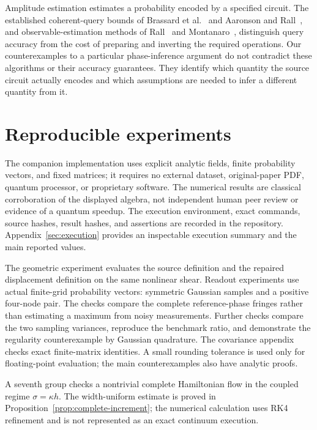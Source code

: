 \documentclass[11pt]{article}
\theoremstyle{definition}
\theoremstyle{remark}
\begin{document}
Amplitude estimation estimates a probability encoded by a specified circuit.
The established coherent-query bounds of Brassard et al.~\cite{bhmt} and
Aaronson and Rall~\cite{aaronsonrall}, and observable-estimation methods of
Rall~\cite{rall,rallcoherent} and Montanaro~\cite{montanaro}, distinguish query
accuracy from the cost of preparing and inverting the required operations.
Our counterexamples to a particular phase-inference argument do not contradict
these algorithms or their accuracy guarantees. They identify which quantity
the source circuit actually encodes and which assumptions are needed to infer
a different quantity from it.







\section{Reproducible experiments}
\label{sec:experiments}
The companion implementation uses explicit analytic fields, finite probability
vectors, and fixed matrices; it requires no external dataset, original-paper
PDF, quantum processor, or proprietary software. The numerical results are
classical corroboration of the displayed algebra, not independent human peer
review or evidence of a quantum speedup. The execution environment, exact
commands, source hashes, result hashes, and assertions are recorded in the
repository. Appendix~\ref{sec:execution} provides an inspectable execution
summary and the main reported values.

The geometric experiment evaluates the source definition and the repaired
displacement definition on the same nonlinear shear. Readout experiments use
actual finite-grid probability vectors: symmetric Gaussian samples and a
positive four-node pair. The checks compare the complete reference-phase
fringes rather than estimating a maximum from noisy measurements. Further
checks compare the two sampling variances, reproduce the benchmark ratio,
and demonstrate the regularity counterexample by Gaussian quadrature.
The covariance appendix checks exact finite-matrix identities. A small
rounding tolerance is used only for floating-point evaluation; the main
counterexamples also have analytic proofs.

A seventh group checks a nontrivial complete Hamiltonian flow in the coupled
regime $\sigma=\kappa h$. The width-uniform estimate is proved in
Proposition~\ref{prop:complete-increment}; the numerical calculation uses
RK4 refinement and is not represented as an exact continuum execution.
\end{document}
